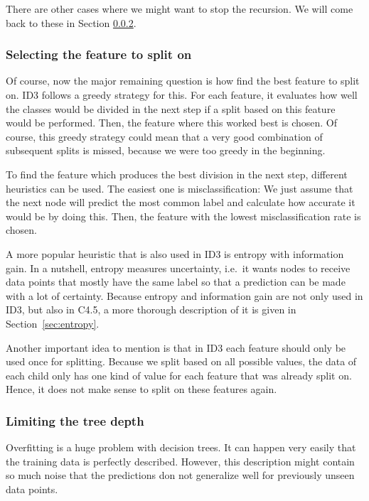 \documentclass[a4paper]{article}
\begin{document}
There are other cases where we might want to stop the recursion. We will come back to these in Section \ref{subsec:id3-depth}.

\subsubsection{Selecting the feature to split on}

Of course, now the major remaining question is how find the best feature to split on. ID3 follows a greedy strategy for this. For each feature, it evaluates how well the classes would be divided in the next step if a split based on this feature would be performed. Then, the feature where this worked best is chosen. Of course, this greedy strategy could mean that a very good combination of subsequent splits is missed, because we were too greedy in the beginning.

To find the feature which produces the best division in the next step, different heuristics can be used. The easiest one is misclassification: We just assume that the next node will predict the most common label and calculate how accurate it would be by doing this. Then, the feature with the lowest misclassification rate is chosen.

A more popular heuristic that is also used in ID3 is entropy with information gain. In a nutshell, entropy measures uncertainty, i.e.\ it wants nodes to receive data points that mostly have the same label so that a prediction can be made with a lot of certainty. Because entropy and information gain are not only used in ID3, but also in C4.5, a more thorough description of it is given in Section~\ref{sec:entropy}.

Another important idea to mention is that in ID3 each feature should only be used once for splitting. Because we split based on all possible values, the data of each child only has one kind of value for each feature that was already split on. Hence, it does not make sense to split on these features again.

\subsubsection{Limiting the tree depth}
\label{subsec:id3-depth}

Overfitting is a huge problem with decision trees. It can happen very easily that the training data is perfectly described. However, this description might contain so much noise that the predictions don not generalize well for previously unseen data points.
\end{document}
